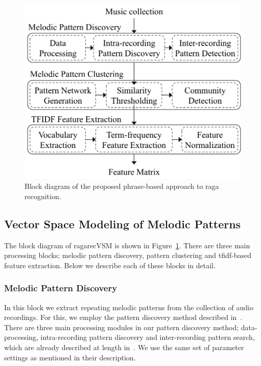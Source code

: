 \begin{figure}
	\begin{center}
		\includegraphics[width=\figSizeSeventy]{ch07_ragaRecognition/figures/bd_phasebased_raga_recognition.pdf}
	\end{center}
	\caption{Block diagram of the proposed phrase-based approach to \gls{raga} recognition.}
	\label{fig:bd_phasebased_raga_recognition}
\end{figure}


\subsection{Vector Space Modeling of Melodic Patterns}
\label{sec:vsm_feature_extraction}

The block diagram of \acrshort{ragarecVSM} is shown in Figure~\ref{fig:bd_phasebased_raga_recognition}. There are three main processing blocks; melodic pattern discovery, pattern clustering and \gls{tfidf}-based feature extraction. Below we describe each of these blocks in detail. 

\subsubsection{Melodic Pattern Discovery}
\label{sec:vsm_feature_extraction_pattern_discovery}

In this block we extract repeating melodic patterns from the collection of audio recordings. For this, we employ the pattern discovery method described in~. There are three main processing modules in our pattern discovery method; data-processing, intra-recording pattern discovery and inter-recording pattern search,  which are already described at length in~. We use the same set of parameter settings as mentioned in their description. 

